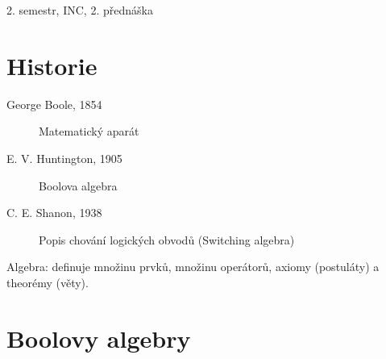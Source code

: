 \documentclass[a4paper, 11pt]{report}
\begin{document}
2. semestr, INC, 2. přednáška

\section{Historie}
\begin{description}
	\item[George Boole, 1854] Matematický aparát
	\item[E. V. Huntington, 1905] Boolova algebra
	\item[C. E. Shanon, 1938] Popis chování logických obvodů (Switching algebra)
\end{description}

Algebra: definuje množinu prvků, množinu operátorů, axiomy (postuláty) a theorémy (věty).

\section{Boolovy algebry}
\end{document}

